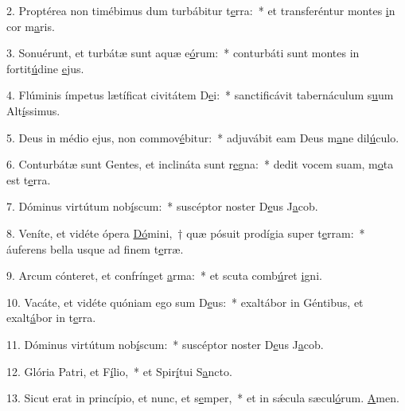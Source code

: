 2. Proptérea non timébimus dum turbábitur t\uline{e}rra:~* et transferéntur montes \uline{i}n cor m\uline{a}ris.\par 
3. Sonuérunt, et turbátæ sunt aquæ e\uline{ó}rum:~* conturbáti sunt montes in fortit\uline{ú}dine \uline{e}jus.\par 
4. Flúminis ímpetus lætíficat civitátem D\uline{e}i:~* sanctificávit tabernáculum s\uline{u}um Alt\uline{í}ssimus.\par 
5. Deus in médio ejus, non commov\uline{é}bitur:~* adjuvábit eam Deus m\uline{a}ne dil\uline{ú}culo.\par 
6. Conturbátæ sunt Gentes, et inclináta sunt r\uline{e}gna:~* dedit vocem suam, m\uline{o}ta est t\uline{e}rra.\par 
7. Dóminus virtútum nob\uline{í}scum:~* suscéptor noster D\uline{e}us J\uline{a}cob.\par 
8. Veníte, et vidéte ópera \uline{Dó}mini,~† quæ pósuit prodígia super t\uline{e}rram:~* áuferens bella usque ad f\uline{i}nem t\uline{e}rræ.\par 
9. Arcum cónteret, et confrínget \uline{a}rma:~* et scuta comb\uline{ú}ret \uline{i}gni.\par 
10. Vacáte, et vidéte quóniam ego sum D\uline{e}us:~* exaltábor in Géntibus, et exalt\uline{á}bor in t\uline{e}rra.\par 
11. Dóminus virtútum nob\uline{í}scum:~* suscéptor noster D\uline{e}us J\uline{a}cob.\par 
12. Glória Patri, et F\uline{í}lio,~* et Spir\uline{í}tui S\uline{a}ncto.\par 
13. Sicut erat in princípio, et nunc, et s\uline{e}mper,~* et in sǽcula sæcul\uline{ó}rum. \uline{A}men.\par 
